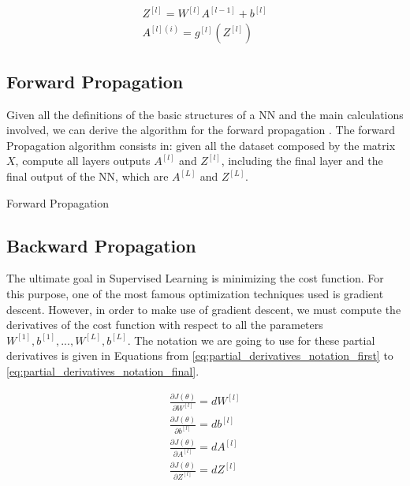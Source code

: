 \begin{align}
Z^{[l]} = W^{[l]}A^{[l-1]} + b^{[l]}
\label{eq:linear_update_nn_vectorized}
\\
A^{[l](i)} = g^{[l]}(Z^{[l]})
\label{eq:non_linear_update_nn_vectorized}
\end{align}

\subsection{Forward Propagation}

Given all the definitions of the basic structures of a NN and the main calculations involved, we can derive the algorithm for the forward propagation \cite{neuralnetworks}. The forward Propagation algorithm consists in: given all the dataset composed by the matrix $X$, compute all layers outputs $A^{[l]}$ and $Z^{[l]}$, including the final layer and the final output of the NN, which are $A^{[L]}$ and $Z^{[L]}$.

\begin{algorithm}[H]
    \DontPrintSemicolon
    \SetAlgoLined
    \caption{Forward Propagation}
    \label{algo:forward_propagation}
\end{algorithm}

\subsection{Backward Propagation}

The ultimate goal in Supervised Learning is minimizing the cost function. For this purpose, one of the most famous optimization techniques used is gradient descent. However, in order to make use of gradient descent, we must compute the derivatives of the cost function with respect to all the parameters $W^{[1]}, b^{[1]}, ..., W^{[L]}, b^{[L]}$. The notation we are going to use for these partial derivatives is given in Equations from \eqref{eq:partial_derivatives_notation_first} to \eqref{eq:partial_derivatives_notation_final}.

\begin{align}
\frac{\partial J(\theta)}{\partial W^{[l]}} = dW^{[l]}
\label{eq:partial_derivatives_notation_first}
\\
\frac{\partial J(\theta)}{\partial b^{[l]}} = db^{[l]} \\
\frac{\partial J(\theta)}{\partial A^{[l]}} = dA^{[l]} \\
\frac{\partial J(\theta)}{\partial Z^{[l]}} = dZ^{[l]}
\label{eq:partial_derivatives_notation_final}
\end{align}

